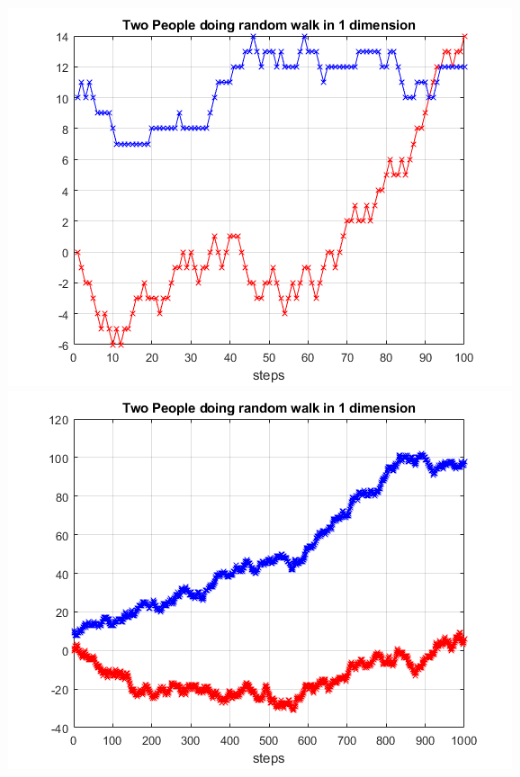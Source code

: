 \documentclass{article}
\begin{document}
\begin{center}
    \begin{multicols}{2}[\columnsep=1cm]
        \centering
        \includegraphics[scale=0.5]{1d2randwalk100.png}
        \columnbreak
        \includegraphics[scale=0.5]{1d2randwalk1000.png}
        \end{multicols}
\end{center}
\end{document}
